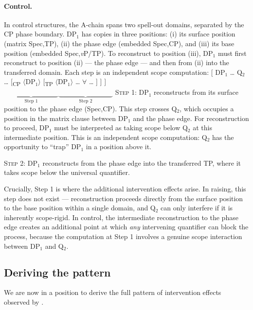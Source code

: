 \documentclass[12pt]{article}
\begin{document}
\paragraph{Control.} In control structures, the A-chain spans two spell-out domains, separated by the CP phase boundary. DP$_1$ has copies in three positions: (i) its surface position (matrix Spec,TP), (ii) the phase edge (embedded Spec,CP), and (iii) its base position (embedded Spec,\emph{v}P/TP). To reconstruct to position (iii), DP$_1$ must first reconstruct to position (ii) --- the phase edge --- and then from (ii) into the transferred domain. Each step is an independent scope computation:
%
\ex\label{ex:control-recon}
{[} DP$_1$ \ldots{} Q$_2$ \ldots{} {[}\textsubscript{CP} $\langle$DP$_1\rangle$ {[}\textsubscript{TP} $\langle$DP$_1\rangle$ \ldots{} $\forall$ \ldots{} {]} {]} {]}\\[4pt]
$\underbrace{\hspace{8em}}_{\text{Step 1}}$\hspace{4.5em}$\underbrace{\hspace{8em}}_{\text{Step 2}}$
\xe
%
\textsc{Step 1}: DP$_1$ reconstructs from its surface position to the phase edge (Spec,CP). This step crosses Q$_2$, which occupies a position in the matrix clause between DP$_1$ and the phase edge. For reconstruction to proceed, DP$_1$ must be interpreted as taking scope below Q$_2$ at this intermediate position. This is an independent scope computation: Q$_2$ has the opportunity to ``trap'' DP$_1$ in a position above it.

\textsc{Step 2}: DP$_1$ reconstructs from the phase edge into the transferred TP, where it takes scope below the universal quantifier.

Crucially, Step 1 is where the additional intervention effects arise. In raising, this step does not exist --- reconstruction proceeds directly from the surface position to the base position within a single domain, and Q$_2$ can only interfere if it is inherently scope-rigid. In control, the intermediate reconstruction to the phase edge creates an additional point at which \emph{any} intervening quantifier can block the process, because the computation at Step 1 involves a genuine scope interaction between DP$_1$ and Q$_2$.

\subsection{Deriving the pattern}\label{sec:deriving}

We are now in a position to derive the full pattern of intervention effects observed by \citeauthor{neeleman2006}.
\end{document}
